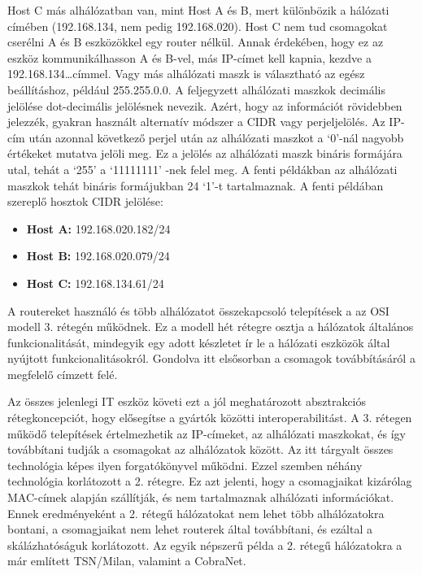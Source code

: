 Host C más alhálózatban van, mint Host A és B, mert különbözik a hálózati címében (192.168.134, nem pedig 192.168.020).
Host C nem tud csomagokat cserélni A és B eszközökkel egy router nélkül. 
Annak érdekében, hogy ez az eszköz kommunikálhasson A és B-vel, más IP-címet kell kapnia,
kezdve a 192.168.134\ldots címmel. 
Vagy más alhálózati maszk is választható az egész beállításhoz,
például 255.255.0.0.
A feljegyzett alhálózati maszkok decimális jelölése dot-decimális jelölésnek nevezik.
Azért, hogy az információt rövidebben jelezzék, gyakran
használt alternatív módszer a CIDR vagy perjeljelölés.
Az IP-cím után azonnal következő perjel után az
alhálózati maszkot a `0'-nál nagyobb értékeket mutatva jelöli meg.
Ez a jelölés az alhálózati maszk bináris formájára utal, tehát a `255' a `11111111' -nek felel meg.
A fenti példákban az alhálózati maszkok tehát bináris formájukban 24
`1'-t tartalmaznak. 
A fenti példában szereplő hosztok CIDR jelölése:

\begin{itemize}
    \item \textbf{Host A:} 192.168.020.182/24
    \item \textbf{Host B:} 192.168.020.079/24
    \item \textbf{Host C:} 192.168.134.61/24
\end{itemize}

A routereket használó és több alhálózatot összekapcsoló telepítések a
az OSI modell 3. rétegén működnek. Ez a modell hét rétegre osztja a
hálózatok általános funkcionalitását, mindegyik egy adott készletet ír le a hálózati
eszközök által nyújtott funkcionalitásokról. Gondolva itt elsősorban a csomagok továbbításáról a
megfelelő címzett felé. 

Az összes jelenlegi IT eszköz követi ezt a jól
meghatározott absztrakciós rétegkoncepciót, hogy elősegítse a gyártók közötti
interoperabilitást. A 3. rétegen működő telepítések értelmezhetik az IP-címeket,
az alhálózati maszkokat, és így továbbítani tudják a csomagokat az
alhálózatok között. Az itt tárgyalt összes technológia képes ilyen
forgatókönyvel működni. Ezzel szemben néhány technológia korlátozott a 2.
rétegre. Ez azt jelenti, hogy a csomagjaikat kizárólag MAC-címek alapján
szállítják, és nem tartalmaznak alhálózati információkat. Ennek eredményeként a
2. rétegű hálózatokat nem lehet több alhálózatokra bontani, a csomagjaikat nem
lehet routerek által továbbítani, és ezáltal a skálázhatóságuk korlátozott. 
Az egyik népszerű példa a 2. rétegű hálózatokra a már említett TSN/Milan, valamint a CobraNet.

